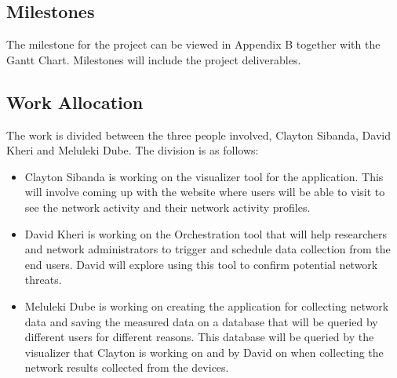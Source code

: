 \subsection{Milestones}
The milestone for the project can be viewed in Appendix B together with the Gantt Chart. Milestones will include the project deliverables.
\subsection{Work Allocation}
The work is divided between the three people involved, Clayton Sibanda, David Kheri and Meluleki Dube. The division is as follows:
\begin{itemize}
	\item Clayton Sibanda is working on the visualizer tool for the application. This will involve coming up with the website where users will be able to visit to see the network activity and their network activity profiles.
	\item David Kheri is working on the Orchestration tool that will help researchers and network administrators to trigger and schedule data collection from the end users. David will explore using this tool to confirm potential network threats.
	\item  Meluleki Dube is working on creating the application for collecting network data and saving the measured data on a database that will be queried by different users for different reasons. This database will be queried by the visualizer that Clayton is working on and by David on when collecting the network results collected from the devices.
\end{itemize}
